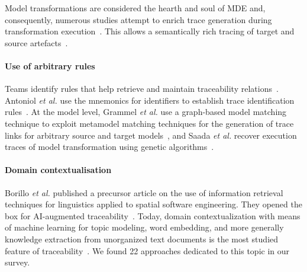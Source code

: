 Model transformations are considered the hearth and soul of MDE and, consequently, numerous studies attempt to enrich trace generation during transformation execution~\cite{vara2014-traceability-in-MDD-MTransfo,Saada_2013,la_Fosse_2018}. This allows a semantically rich tracing of target and source artefacts~\cite{paige2011-traces-in-moel-driven-engineering}. 



\paragraph{Use of arbitrary rules} 
Teams identify rules that help retrieve and maintain traceability relations~\cite{mader2008-rule-based-maintenance-post-requirements-traceability,spanoudakis2004-rule-based-generation-of-req-traceability-relations}.
Antoniol \textit{et al.} use the mnemonics for identifiers to establish trace identification rules~\cite{antoniol2002-tracing-code-documentation-links}.
At the model level, Grammel \textit{et al.} use a graph-based model matching technique to exploit metamodel matching techniques for the generation of trace links for arbitrary source and target models~\cite{grammel2012-model-matching-for-traceability-in-MDE}, and Saada \textit{et al.} recover  execution traces of model transformation using genetic algorithms~\cite{Saada_2013}.


\paragraph{Domain contextualisation} 
Borillo \textit{et al.} published a precursor article on the use of information retrieval techniques for linguistics applied to spatial software engineering. They opened the box for AI-augmented traceability~\cite{borillo1992-linguistic-engineering-to-spacial-SE}. 
Today, domain contextualization with means of machine learning for topic modeling, word embedding, and more generally knowledge extraction from unorganized text documents is the most studied feature of traceability~\cite{guo2017-semantically-enhanced-tracebility-deep-learning,wohlrab2020-traceability-organization-process-culture}. We found 22 approaches dedicated to this topic in our survey. 

